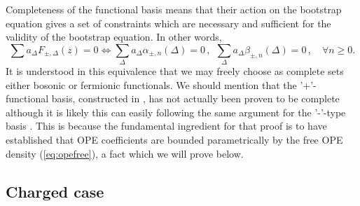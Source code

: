 \documentclass[12pt]{article}
\numberwithin{equation}{section}
\newcommand{\reef}[1]{(\ref{#1})}
\newcommand{\be}{\begin{equation}}
\newcommand{\ee}{\end{equation}}
\def\a{\alpha}
\def\b{\beta}
\def\D{\Delta}
\begin{document}
	Completeness of the functional basis means that their action on the bootstrap equation gives a set of constraints which are necessary and sufficient for the validity of the bootstrap equation. In other words,
	\be
	\sum a_\D F_{\pm,\D}(z)=0 \Leftrightarrow \sum_\D a_\D \a_{\pm,n}(\D)=0\,, \ \ \sum_\D a_\D \b_{\pm,n}(\D)=0\,, \quad \forall n\geq 0.
	\ee
	It is understood in this equivalence that we may freely choose as complete sets either bosonic or fermionic functionals. We should mention that the '+'-functional basis,  constructed in \cite{Paulos:2019gtx}, has not actually been proven to be complete although it is likely this can easily following the same argument for the '-'-type basis \cite{Mazac:2018ycv}. This is because the fundamental ingredient for that proof is to have established that OPE coefficients are bounded parametrically by the free OPE density \reef{eq:opefree}, a fact which we will prove below.
	
	\subsection{Charged case}
	\label{ONsimp}
	
\end{document}
